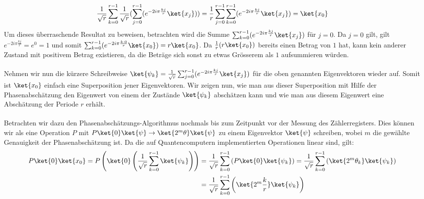 \begin{align*}
    \frac{1}{\sqrt{r}}\sum_{k = 0}^{r - 1}\frac{1}{\sqrt{r}}(\sum_{j = 0}^{r - 1}(e^{-2i\pi\frac{kj}{r}}\ket{x_j})) = \frac{1}{r}\sum_{j = 0}^{r - 1}\sum_{k = 0}^{r - 1}(e^{-2i\pi\frac{kj}{r}}\ket{x_j}) = \ket{x_0}
\end{align*}
Um dieses überraschende Resultat zu beweisen, betrachten wird die Summe $\sum_{k = 0}^{r - 1}(e^{-2i\pi\frac{kj}{r}}\ket{x_j})$ für $j = 0$. Da $j = 0$ gilt, gilt $e^{-2i\pi\frac{kj}{r}} = e^{0} = 1$ und somit $\sum_{k = 0}^{r - 1}(e^{-2i\pi\frac{k\cdot 0}{r}}\ket{x_0}) = r\ket{x_0}$. Da $\frac{1}{r}(r\ket{x_0})$ bereits einen Betrag von $1$ hat, kann kein anderer Zustand mit positivem Betrag existieren, da die Beträge sich sonst zu etwas Grösserem als $1$ aufsummieren würden.

\paragraph{}

Nehmen wir nun die kürzere Schreibweise $\ket{\psi_k} = \frac{1}{\sqrt{r}}\sum_{j = 0}^{r - 1}(e^{-2i\pi\frac{kj}{r}}\ket{x_j})$ für die oben genannten Eigenvektoren wieder auf. Somit ist $\ket{x_0}$ einfach eine Superposition jener Eigenvektoren. Wir zeigen nun, wie man aus dieser Superposition mit Hilfe der Phasenabschätzung den Eigenwert von einem der Zustände $\ket{\psi_k}$ abschätzen kann und wie man aus diesem Eigenwert eine Abschätzung der Periode $r$ erhält.

\paragraph{}
Betrachten wir dazu den Phasenabschätzungs-Algorithmus nochmals bis zum Zeitpunkt vor der Messung des Zählerregisters. Dies können wir als eine Operation $P$ mit $P\ket{0}\ket{\psi} \rightarrow \ket{2^m\theta}\ket{\psi}$ zu einem Eigenvektor $\ket{\psi}$ schreiben, wobei $m$ die gewählte Genauigkeit der Phasenabschätzung ist. Da die auf Quantencomputern implementierten Operationen linear sind, gilt: \begin{align*}P\ket{0}\ket{x_0} = P\left(\ket{0}\left(\frac{1}{\sqrt{r}}\sum_{k = 0}^{r - 1}\ket{\psi_k}\right)\right) &= \frac{1}{\sqrt{r}}\sum_{k = 0}^{r - 1}\left(P\ket{0}\ket{\psi_k}\right) = \frac{1}{\sqrt{r}}\sum_{k = 0}^{r - 1}\left(\ket{2^m\theta_k}\ket{\psi_k}\right) \\ &= \frac{1}{\sqrt{r}}\sum_{k = 0}^{r - 1}\left(\ket{2^m\frac{k}{r}}\ket{\psi_k}\right)\end{align*}

